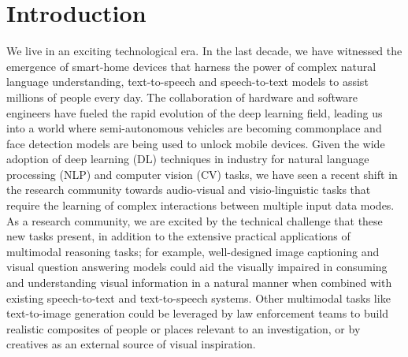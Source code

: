 \chapter{Introduction}
\label{chapter:introduction}

We live in an exciting technological era. In the last decade, we have witnessed the emergence of smart-home devices that harness the power of complex natural language understanding, text-to-speech and speech-to-text models to assist millions of people every day. The collaboration of hardware and software engineers have fueled the rapid evolution of the deep learning field, leading us into a world where semi-autonomous vehicles are becoming commonplace and face detection models are being used to unlock mobile devices. Given the wide adoption of deep learning (DL) techniques in industry for natural language processing (NLP) and computer vision (CV) tasks, we have seen a recent shift in the research community towards audio-visual and visio-linguistic tasks that require the learning of complex interactions between multiple input data modes. As a research community, we are excited by the technical challenge that these new tasks present, in addition to the extensive practical applications of multimodal reasoning tasks; for example, well-designed image captioning and visual question answering models could aid the visually impaired in consuming and understanding visual information in a natural manner when combined with existing speech-to-text and text-to-speech systems. Other multimodal tasks like text-to-image generation could be leveraged by law enforcement teams to build realistic composites of people or places relevant to an investigation, or by creatives as an external source of visual inspiration.





